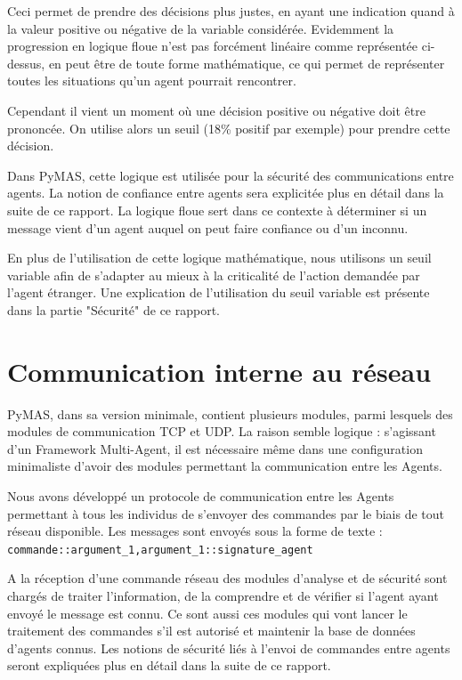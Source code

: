 \documentclass[11pt]{book}
\begin{document}
Ceci permet de prendre des décisions plus justes, en ayant une indication 
quand à la valeur positive ou négative de la variable considérée. 
Evidemment la progression en logique floue n'est pas forcément linéaire 
comme représentée ci-dessus, en peut être de toute forme mathématique, ce 
qui permet de représenter toutes les situations qu'un agent pourrait 
rencontrer.

Cependant il vient un moment où une décision positive ou négative doit 
être prononcée. On utilise alors un seuil (18\% positif par exemple) pour 
prendre cette décision.

Dans PyMAS, cette logique est utilisée pour la sécurité des communications 
entre agents. La notion de confiance entre agents sera explicitée plus en 
détail dans la suite de ce rapport. La logique floue sert dans ce
contexte à déterminer si un message vient d’un agent auquel on peut faire 
confiance ou d’un inconnu. 

En plus de l’utilisation de cette logique mathématique, nous utilisons un 
seuil variable afin de s'adapter au mieux à la criticalité de l’action 
demandée par l'agent étranger. Une explication de l'utilisation du seuil 
variable est présente dans la partie "Sécurité" de ce rapport.

\section{Communication interne au réseau}
PyMAS, dans sa version minimale, contient plusieurs modules, parmi lesquels 
des modules de communication TCP et UDP. La raison semble logique : 
s'agissant d’un Framework Multi-Agent, il est nécessaire même dans une 
configuration minimaliste d’avoir des modules permettant la communication 
entre les Agents.

Nous avons développé un protocole de communication entre les Agents 
permettant à tous les individus de s'envoyer des commandes par le biais de 
tout réseau disponible. Les messages sont envoyés sous la forme de texte :
\verb?commande::argument_1,argument_1::signature_agent?

A la réception d'une commande réseau des modules d'analyse et de sécurité 
sont chargés de traiter l'information, de la comprendre et de vérifier 
si l'agent ayant envoyé le message est connu. Ce sont aussi ces modules qui 
vont lancer le traitement des commandes s'il est autorisé et maintenir la 
base de données d'agents connus. Les notions de sécurité liés à l'envoi 
de commandes entre agents seront expliquées plus en détail dans la suite 
de ce rapport.
\end{document}
